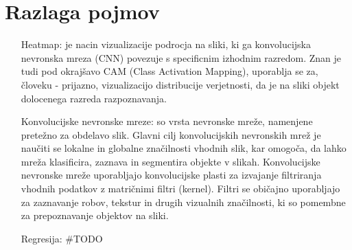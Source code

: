 \documentclass[a4paper,twoside,openright,12pt,slovene]{book}
\begin{document}
\chapter{Razlaga pojmov} \label{razlaga_pojmov}
\begin{itemize}
    \item[Heatmap:] \label{heatmap} je nacin vizualizacije podrocja na sliki, ki ga konvolucijska nevronska mreza (CNN) povezuje s specificnim izhodnim razredom. Znan je tudi pod okrajšavo CAM (Class Activation Mapping), uporablja se za, človeku - prijazno, vizualizacijo distribucije verjetnosti, da je na sliki objekt dolocenega razreda razpoznavanja. \cite{heatmap_website}

    \item[Konvolucijske nevronske mreze:] \label{cnn}so vrsta nevronske mreže, namenjene pretežno za obdelavo slik. Glavni cilj konvolucijskih nevronskih mrež je naučiti se lokalne in globalne značilnosti vhodnih slik, kar omogoča, da lahko mreža klasificira, zaznava in segmentira objekte v slikah. Konvolucijske nevronske mreže uporabljajo konvolucijske plasti za izvajanje filtriranja vhodnih podatkov z matričnimi filtri (kernel). Filtri se običajno uporabljajo za zaznavanje robov, tekstur in drugih vizualnih značilnosti, ki so pomembne za prepoznavanje objektov na sliki. \cite{cnn_clanek}

    \item[Regresija:] #TODO
\end{itemize}
\end{document}
